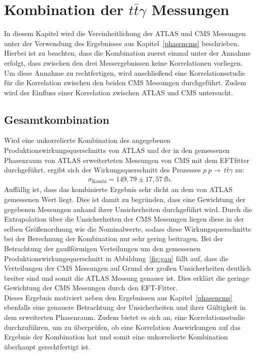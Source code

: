 \chapter{Kombination der \texorpdfstring {$t\bar{t}\gamma$}{math} Messungen}
In diesem Kapitel wird die Vereinheitlichung der ATLAS und CMS Messungen unter der Verwendung des Ergebnisses aus Kapitel~\ref{phasencms} beschrieben. Hierbei ist zu beachten, dass die Kombination zuerst einmal unter der Annahme erfolgt, dass zwischen den drei Messergebnissen keine Korrelationen vorliegen. Um diese Annahme zu rechtfertigen, wird anschließend eine Korrelationsstudie für die Korrelation zwischen den beiden CMS Messungen durchgeführt. Zudem wird der Einfluss einer Korrelation zwischen ATLAS und CMS untersucht.

\section{Gesamtkombination}
\label{kombi}
Wird eine unkorrelierte Kombination des angegebenen Produktionswirkungsquerschnitts von ATLAS und der in den gemessenen Phasenraum von ATLAS erweiterteten Messungen von CMS mit dem EFTfitter durchgeführt, ergibt sich der Wirkungsquerschnitt des Prozesses $p~p \rightarrow~t\bar{t}\gamma$ zu:
\begin{align}
  \sigma_{\text{Kombi}} = 149,79 \pm 17,57~ \si{\femto\barn}.
\end{align}
Auffällig ist, dass das kombinierte Ergebnis sehr dicht an dem von ATLAS gemessenen Wert liegt.
Dies ist damit zu begründen, dass eine Gewichtung der gegebenen Messungen anhand ihrer Unsicherheiten durchgeführt wird.
Durch die Extrapolation über die Unsicherheiten der CMS Messungen liegen diese in der selben Größenordnung wie die Nominalwerte, sodass diese Wirkungsquerschnitte bei der Berechnung der Kombination nur sehr gering beitragen.
Bei der Betrachtung der gaußförmigen Verteilungen um den gemessenen Produktionswirkungsquerschnitt in Abbildung~\ref{fig:gau} fällt auf, dass die Verteilungen der CMS Messungen auf Grund der großen Unsicherheiten deutlich breiter sind und somit die ATLAS Messung genauer ist.
Dies erklärt die geringe Gewichtung der CMS Messungen durch den EFT-Fitter.\\
Dieses Ergebnis motiviert neben den Ergebnissen aus Kapitel~\ref{phasencms} ebenfalls eine genauere Betrachtung der Unsicherheiten und ihrer Gültigkeit in dem erweiterten Phasenraum. Zudem bietet es sich an, eine Korrelationsstudie durchzuführen, um zu überprüfen, ob eine Korrelation Auswirkungen auf das Ergebnis der Kombination hat und somit eine unkorrelierte Kombination überhaupt gerechtfertigt ist.

